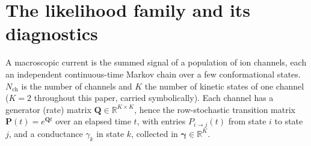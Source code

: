 \section*{The likelihood family and its diagnostics}

A macroscopic current is the summed signal of a population of ion channels, each an
independent continuous-time Markov chain over a few conformational states. $N_{\mathrm{ch}}$
is the number of channels and $K$ the number of kinetic states of one channel ($K=2$ %
throughout this paper, carried symbolically). Each channel has a generator (rate) matrix
$\mathbf{Q}\in\mathbb{R}^{K\times K}$, hence the row-stochastic transition matrix
$\mathbf{P}(t)=e^{\mathbf{Q}t}$ over an elapsed time $t$, with entries $P_{i\to j}(t)$ from
state $i$ to state $j$, and a conductance $\gamma_k$ in state $k$, collected in
$\bm{\gamma}\in\mathbb{R}^{K}$.

